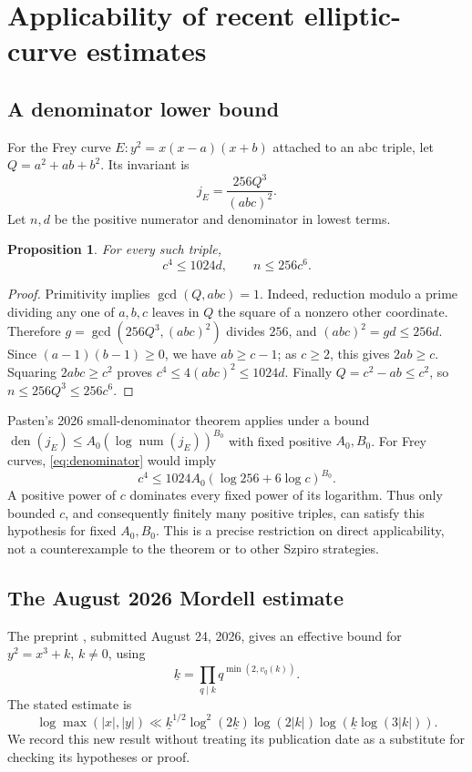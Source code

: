 \documentclass[11pt]{amsart}
\newtheorem{proposition}[theorem]{Proposition}
\theoremstyle{definition}
\theoremstyle{remark}
\newcommand{\den}{\operatorname{den}}
\newcommand{\num}{\operatorname{num}}
\begin{document}
\section{Applicability of recent elliptic-curve estimates}\label{sec:frey}

\subsection{A denominator lower bound}
For the Frey curve $E:y^2=x(x-a)(x+b)$ attached to an abc triple, let
$Q=a^2+ab+b^2$. Its invariant is
\[
 j_E=\frac{256Q^3}{(abc)^2}.
\]
Let $n,d$ be the positive numerator and denominator in lowest terms.

\begin{proposition}\label{prop:denominator}
For every such triple,
\begin{equation}\label{eq:denominator}
 c^4\le1024d,\qquad n\le256c^6.
\end{equation}
\end{proposition}
\begin{proof}
Primitivity implies $\gcd(Q,abc)=1$. Indeed, reduction modulo a prime
dividing any one of $a,b,c$ leaves in $Q$ the square of a nonzero other
coordinate. Therefore $g=\gcd(256Q^3,(abc)^2)$ divides $256$, and
$(abc)^2=gd\le256d$.
Since $(a-1)(b-1)\ge0$, we have $ab\ge c-1$; as $c\ge2$, this gives
$2ab\ge c$. Squaring $2abc\ge c^2$ proves
$c^4\le4(abc)^2\le1024d$.
Finally $Q=c^2-ab\le c^2$, so $n\le256Q^3\le256c^6$.
\end{proof}

Pasten's 2026 small-denominator theorem
\cite[Theorem~1.2]{PastenSmall} applies under a bound
$\den(j_E)\le A_0(\log\num(j_E))^{B_0}$ with fixed positive
$A_0,B_0$. For Frey curves, \eqref{eq:denominator} would imply
\[
 c^4\le1024A_0(\log256+6\log c)^{B_0}.
\]
A positive power of $c$ dominates every fixed power of its logarithm.
Thus only bounded $c$, and consequently finitely many positive triples,
can satisfy this hypothesis for fixed $A_0,B_0$.
This is a precise restriction on direct applicability, not a
counterexample to the theorem or to other Szpiro strategies.

\subsection{The August 2026 Mordell estimate}
The preprint \cite[Theorem~1.3]{PastenNew}, submitted August 24, 2026,
gives an effective bound for $y^2=x^3+k$, $k\ne0$, using
\[
 \underline{k}=\prod_{q\mid k}q^{\min(2,v_q(k))}.
\]
The stated estimate is
\begin{equation}\label{eq:pasten}
 \log\max(|x|,|y|)\ll
 \underline{k}^{1/2}\log^2(2\underline{k})\log(2|k|)
 \log\!\left(\underline{k}\log(3|k|)\right).
\end{equation}
We record this new result without treating its publication date as a
substitute for checking its hypotheses or proof.
\end{document}
